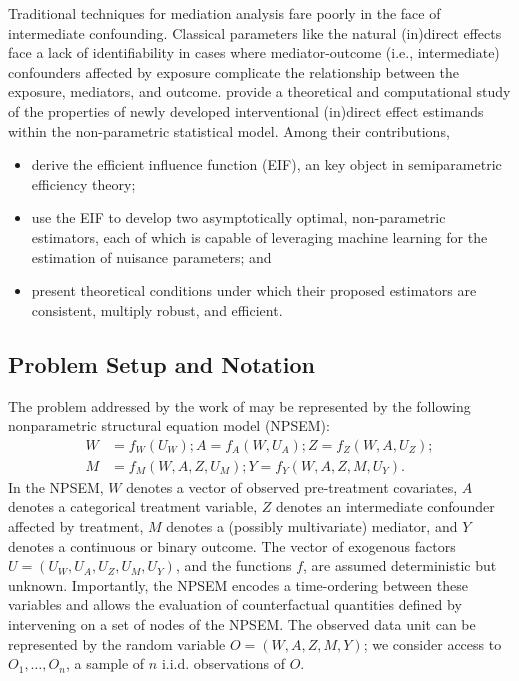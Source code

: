 \documentclass[
  12pt,
]{book}
\providecommand{\tightlist}{%
  \setlength{\itemsep}{0pt}\setlength{\parskip}{0pt}}
\theoremstyle{definition}
\theoremstyle{definition}
\theoremstyle{definition}
\newcommand{\1}{\mathbbm{1}}
\begin{document}
Traditional techniques for mediation analysis fare poorly in the face of
intermediate confounding. Classical parameters like the natural (in)direct
effects face a lack of identifiability in cases where mediator-outcome (i.e.,
intermediate) confounders affected by exposure complicate the relationship
between the exposure, mediators, and outcome. \citet{diaz2020nonparametric} provide a
theoretical and computational study of the properties of newly developed
interventional (in)direct effect estimands within the non-parametric statistical
model. Among their contributions, \citet{diaz2020nonparametric}

\begin{itemize}
\tightlist
\item
  derive the efficient influence function (EIF), an key object in
  semiparametric efficiency theory;
\item
  use the EIF to develop two asymptotically optimal, non-parametric estimators,
  each of which is capable of leveraging machine learning for the estimation of
  nuisance parameters; and
\item
  present theoretical conditions under which their proposed estimators are
  consistent, multiply robust, and efficient.
\end{itemize}

\hypertarget{problem-setup-and-notation}{%
\subsection{Problem Setup and Notation}\label{problem-setup-and-notation}}

The problem addressed by the work of \citet{diaz2020nonparametric} may be represented
by the following nonparametric structural equation model (NPSEM):
\begin{align*}
  W &= f_W(U_W); A = f_A(W, U_A); Z=f_Z(W, A, U_Z);\\ \nonumber
  M &= f_M(W, A, Z, U_M); Y = f_Y(W, A, Z, M, U_Y).
\end{align*}
In the NPSEM, \(W\) denotes a vector of observed pre-treatment covariates, \(A\)
denotes a categorical treatment variable, \(Z\) denotes an intermediate confounder
affected by treatment, \(M\) denotes a (possibly multivariate) mediator, and \(Y\)
denotes a continuous or binary outcome. The vector of exogenous factors
\(U=(U_W,U_A,U_Z,U_M,U_Y)\), and the functions \(f\), are assumed deterministic but
unknown. Importantly, the NPSEM encodes a time-ordering between these variables
and allows the evaluation of counterfactual quantities defined by intervening on
a set of nodes of the NPSEM. The observed data unit can be represented by the
random variable \(O = (W, A, Z, M, Y)\); we consider access to \(O_1, \ldots, O_n\),
a sample of \(n\) i.i.d. observations of \(O\).
\end{document}
